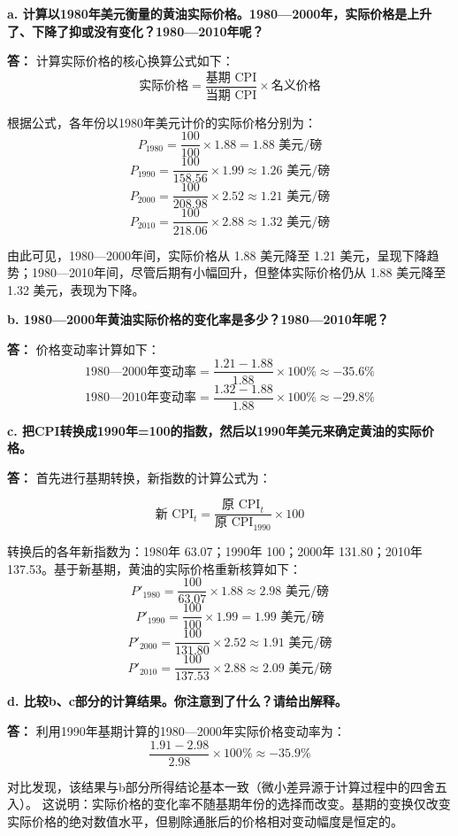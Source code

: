 \begin{enumerate}[label=\textbf{\arabic*.}, leftmargin=*]
		\textbf{a. 计算以1980年美元衡量的黄油实际价格。1980—2000年，实际价格是上升了、下降了抑或没有变化？1980—2010年呢？}
		
		\textbf{答：}
		计算实际价格的核心换算公式如下：
			$$ \text{实际价格} = \frac{\text{基期 CPI}}{\text{当期 CPI}} \times \text{名义价格} $$
		
		根据公式，各年份以1980年美元计价的实际价格分别为：
		$$ P_{1980} = \frac{100}{100} \times 1.88 = 1.88 \text{ 美元/磅} $$
		$$ P_{1990} = \frac{100}{158.56} \times 1.99 \approx 1.26 \text{ 美元/磅} $$
		$$ P_{2000} = \frac{100}{208.98} \times 2.52 \approx 1.21 \text{ 美元/磅} $$
		$$ P_{2010} = \frac{100}{218.06} \times 2.88 \approx 1.32 \text{ 美元/磅} $$
		
		由此可见，1980—2000年间，实际价格从 1.88 美元降至 1.21 美元，呈现下降趋势；1980—2010年间，尽管后期有小幅回升，但整体实际价格仍从 1.88 美元降至 1.32 美元，表现为下降。
		
		\textbf{b. 1980—2000年黄油实际价格的变化率是多少？1980—2010年呢？}
		
		\textbf{答：}
		价格变动率计算如下：
		$$ \text{1980—2000年变动率} = \frac{1.21 - 1.88}{1.88} \times 100\% \approx -35.6\% $$
		$$ \text{1980—2010年变动率} = \frac{1.32 - 1.88}{1.88} \times 100\% \approx -29.8\% $$
		
		\textbf{c. 把CPI转换成1990年=100的指数，然后以1990年美元来确定黄油的实际价格。}
		
		\textbf{答：}
		首先进行基期转换，新指数的计算公式为：

			$$ \text{新 CPI}_t = \frac{\text{原 CPI}_t}{\text{原 CPI}_{1990}} \times 100 $$

		
		转换后的各年新指数为：1980年 63.07；1990年 100；2000年 131.80；2010年 137.53。基于新基期，黄油的实际价格重新核算如下：
		$$ P'_{1980} = \frac{100}{63.07} \times 1.88 \approx 2.98 \text{ 美元/磅} $$
		$$ P'_{1990} = \frac{100}{100} \times 1.99 = 1.99 \text{ 美元/磅} $$
		$$ P'_{2000} = \frac{100}{131.80} \times 2.52 \approx 1.91 \text{ 美元/磅} $$
		$$ P'_{2010} = \frac{100}{137.53} \times 2.88 \approx 2.09 \text{ 美元/磅} $$
		
		\textbf{d. 比较b、c部分的计算结果。你注意到了什么？请给出解释。}
		
		\textbf{答：}
		利用1990年基期计算的1980—2000年实际价格变动率为：
		$$ \frac{1.91 - 2.98}{2.98} \times 100\% \approx -35.9\% $$
		
		对比发现，该结果与b部分所得结论基本一致（微小差异源于计算过程中的四舍五入）。
		这说明：实际价格的变化率不随基期年份的选择而改变。基期的变换仅改变实际价格的绝对数值水平，但剔除通胀后的价格相对变动幅度是恒定的。
		

\end{enumerate}
